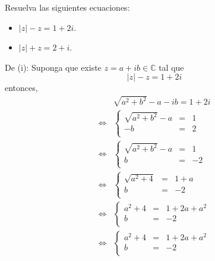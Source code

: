 \documentclass[12pt]{report}
\theoremstyle{largebreak}
\newcommand\abs[1]{\ensuremath{\left|#1\right|}}
\begin{document}
    \begin{excer}
        Resuelva las siguientes ecuaciones:
        \begin{itemize}
            \item $\abs{z}-z=1+2i$.
            \item $\abs{z}+z=2+i$.
        \end{itemize}
    \end{excer}

    \begin{sol}
        De (i): Suponga que existe $z=a+ib\in\mathbb{C}$ tal que
        \begin{equation*}
            \abs{z}-z=1+2i
        \end{equation*}
        entonces,
        \begin{equation*}
            \begin{split}
                &\sqrt{a^2+b^2}-a-ib=1+2i\\
                \iff& \left\{\begin{array}{rcl}
                    \sqrt{a^2+b^2}-a&=&1\\
                    -b&=&2\\
                \end{array} \right.\\
                \iff& \left\{\begin{array}{rcl}
                    \sqrt{a^2+b^2}-a&=&1\\
                    b&=&-2\\
                \end{array} \right.\\
                \iff& \left\{\begin{array}{rcl}
                    \sqrt{a^2+4}&=&1+a\\
                    b&=&-2\\
                \end{array} \right.\\
                \iff& \left\{\begin{array}{rcl}
                    a^2+4&=&1+2a+a^2\\
                    b&=&-2\\
                \end{array} \right.\\
                \iff& \left\{\begin{array}{rcl}
                    a^2+4&=&1+2a+a^2\\
                    b&=&-2\\

\end{array}
\end{split}
\end{equation*}
\end{sol}
\end{document}
